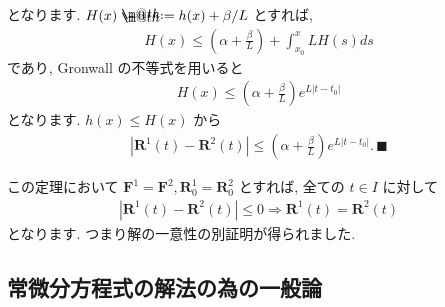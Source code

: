 \documentclass[openany, a4paper, oneside]{jsbook}
\makeatletter
\newcommand*{\defeq}{\mathrel{\rlap{%
\raisebox{0.3ex}{$\m@th\cdot$}}%
\raisebox{-0.3ex}{$\m@th\cdot$}}%
=}
\theoremstyle{break}
\theoremstyle{breakdefn}
\newcommand{\abs}[1]{\left|#1\right|}
\makeatother
\begin{document}
となります.
$H (x) \defeq h (x) + \beta / L$ とすれば,
\begin{gather}
H (x)
\leq
\left ( \alpha + \frac{\beta} {L} \right) + \int_{x_0}^x L H (s) ds
\end{gather}
であり, Gronwall の不等式を用いると
\begin{gather}
H (x)
\leq
\left ( \alpha + \frac{\beta} {L} \right) e^{ L| t - t_0 | }
\end{gather}
となります.
$h (x) \leq H (x)$ から
\begin{gather}
\abs{\bm{R}^1 (t) - \bm{R}^2 (t)}
\leq
\left ( \alpha + \frac{\beta} {L} \right) e^{ L| t - t_0 | } . \, \blacksquare
\end{gather}

この定理において $\bm{F}^1 = \bm{F}^2 ,\bm{R}^1_0 =\bm{R}^2_0$ とすれば,
全ての $t \in I$ に対して
\begin{gather}
\abs{\bm{R}^1 (t) - \bm{R}^2 (t)} \leq 0
\Longrightarrow
\bm{R}^1 (t)
=
\bm{R}^2 (t)
\end{gather}
となります.
つまり解の一意性の別証明が得られました.
\subsection{常微分方程式の解法の為の一般論}
\end{document}
